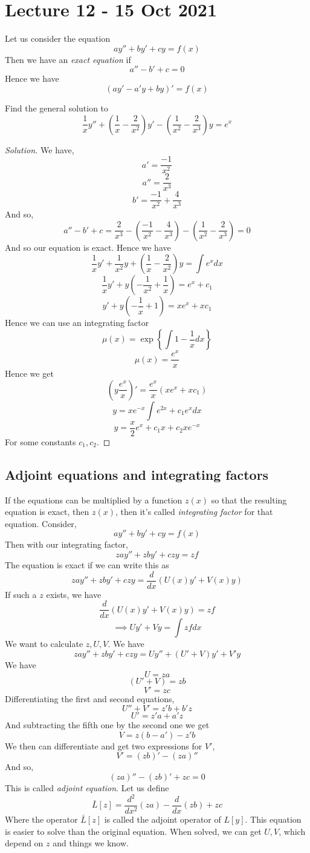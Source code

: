 \section{Lecture 12 - 15 Oct 2021}
\begin{definition} 
  Let us consider the equation 
  \[a y'' + by' + cy = f(x)\]
  Then we have an \emph{exact equation} if 
  \[a''-b'+c =0\]
  Hence we have
  \[(ay'-a'y +by)' = f(x)\]
  \label{exactEq}
\end{definition}
\begin{example}
  Find the general solution to 
  \[\frac{1}{x}y'' + (\frac{1}{x} - \frac{2}{x^2})y' - (\frac{1}{x^2} -
  \frac{2}{x^3})y = e^x\]
\end{example}
\begin{proof}[Solution]
  We have,
  \[a' = \frac{-1}{x^2}\]
  \[a'' = \frac{2}{x^3}\]
  \[b' = \frac{-1}{x^2} + \frac{4}{x^3}\]
  And so,
  \[a''-b'+c = \frac{2}{x^3} - (\frac{-1}{x^2} - \frac{4}{x^3}) - (\frac{1}{x^2} -
  \frac{2}{x^3}) =0\]
  And so our equation is exact. Hence we have
  \[\frac{1}{x}y' + \frac{1}{x^2}y + (\frac{1}{x}-\frac{2}{x^2})y = \int e^x dx\]
  \[\frac{1}{x}y' + y(- \frac{1}{x^2} + \frac{1}{x}) = e^x +c_1 \]
  \[y' + y(- \frac{1}{x} + 1) = xe^x +xc_1 \]
  Hence we can use an integrating factor
  \[\mu (x) = \exp \left\{ \int 1 -\frac{1}{x} dx \right\}\]
  \[\mu (x) = \frac{e^x}{x}\]
  Hence we get
  \[(y \frac{e^x}{x})' = \frac{e^x}{x}(xe^x +xc_1)\]
  \[y = xe^{-x} \int e^{2x} + c_1e^x dx\]
  \[y = \frac{x}{2} e^x + c_1 x + c_2 xe^{-x}\]
  For some constants $c_1,c_2$.
\end{proof}

\subsection{Adjoint equations and integrating factors}
If the equations can be multiplied by a function $z(x)$ so that the resulting equation is
exact, then $z(x)$, then it's called \emph{integrating factor} for that equation.
Consider,
\[ay''+by'+cy=f(x)\]
Then with our integrating factor,
\[zay'' + zby' + czy = zf\]
The equation is exact if we can write this as 
\[zay'' + zby' + czy =\frac{d}{dx}(U(x)y' + V(x) y)\]
If such a $z$ exists, we have
\[\frac{d}{dx}(U(x)y' + V(x) y) = zf\]
\[\implies Uy' + Vy = \int zf dx\]
We want to calculate $z,U,V$. We have 
\[zay'' + zby' + czy = U y'' + (U'+V)y' + V' y\]
We have
\[U = za\]
\[(U'+V) = zb\]
\[V' = zc\]
Differentiating the first and second equations,
\[U'' + V' = z'b + b'z\]
\[U' = z'a + a'z\]
And subtracting the fifth one by the second one we get 
\[V = z(b-a') -z'b\]
We then can differentiate and get two expressions for $V'$,
\[V' = (zb)'-(za)''\]
And so, 
\[(za)'' -(zb)' + zc = 0\]
This is called \emph{adjoint equation}. Let us define
\[\bar{L} [z] = \frac{d^{2}}{dx^2}(za) - \frac{d}{dx}(zb) + zc\]
Where the operator $\bar{L}[z]$ is called the adjoint operator of $L[y]$.
This equation is easier to solve than the original equation. When solved, we can get
$U,V$, which depend on $z$ and things we know.

